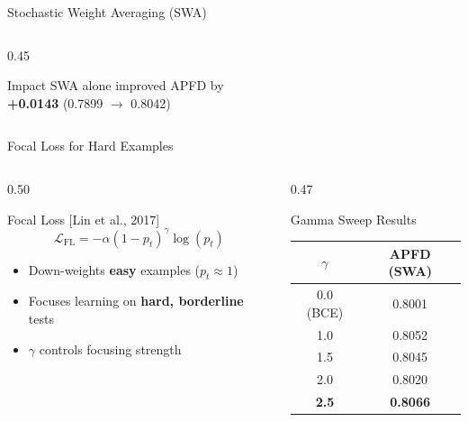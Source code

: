 \documentclass[aspectratio=169, 11pt]{beamer}
\begin{document}
\begin{frame}{Stochastic Weight Averaging (SWA)}
\begin{columns}[T]
\begin{column}{0.45\textwidth}
  
  \vspace{0.3em}
  \begin{exampleblock}{\small Impact}
    SWA alone improved APFD by\\
    \textbf{+0.0143} (0.7899 $\to$ 0.8042)
  \end{exampleblock}
\end{column}
\end{columns}
\end{frame}

\begin{frame}{Focal Loss for Hard Examples}
\begin{columns}[T]
\begin{column}{0.50\textwidth}
  \begin{block}{Focal Loss [Lin et al., 2017]}
    $$\mathcal{L}_{\text{FL}} = -\alpha (1 - p_t)^\gamma \log(p_t)$$
    \begin{itemize}
      \item Down-weights \textbf{easy} examples ($p_t \approx 1$)
      \item Focuses learning on \textbf{hard, borderline} tests
      \item $\gamma$ controls focusing strength
    \end{itemize}
  \end{block}
\end{column}
\begin{column}{0.47\textwidth}
  \begin{block}{Gamma Sweep Results}
    \centering
    \small
    \begin{tabular}{cc}
      \toprule
      $\gamma$ & \textbf{APFD (SWA)} \\
      \midrule
      0.0 (BCE) & 0.8001 \\
      1.0 & 0.8052 \\
      1.5 & 0.8045 \\
      2.0 & 0.8020 \\
      \rowcolor{successgreen!20} \textbf{2.5} & \textbf{0.8066} \\
      \bottomrule
    \end{tabular}
  \end{block}
\end{column}
\end{columns}
\end{frame}
\end{document}
